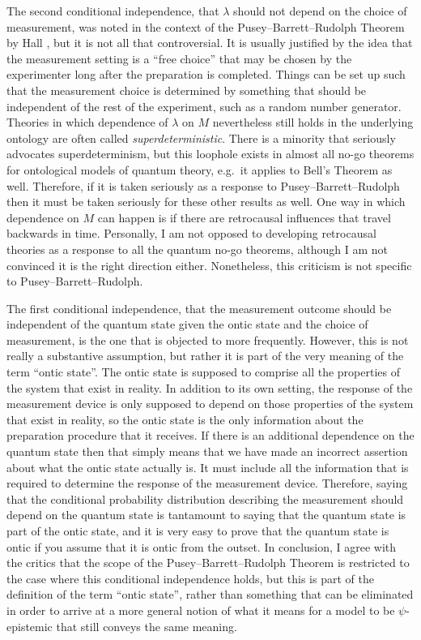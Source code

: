 \documentclass[DIV=calc,fontsize=12pt]{scrartcl} %
\theoremstyle{definition}
\theoremstyle{plain}
\begin{document}
The second conditional independence, that $\lambda$ should not depend
on the choice of measurement, was noted in the context of the
Pusey--Barrett--Rudolph Theorem by Hall \cite{Hall2011}, but it is not
all that controversial.  It is usually justified by the idea that the
measurement setting is a ``free choice'' that may be chosen by the
experimenter long after the preparation is completed.  Things can be
set up such that the measurement choice is determined by something
that should be independent of the rest of the experiment, such as a
random number generator.  Theories in which dependence of $\lambda$ on
$M$ nevertheless still holds in the underlying ontology are often
called \emph{superdeterministic}.  There is a minority that seriously
advocates superdeterminism, but this loophole exists in almost all
no-go theorems for ontological models of quantum theory, e.g.\ it
applies to Bell's Theorem as well.  Therefore, if it is taken
seriously as a response to Pusey--Barrett--Rudolph then it must be
taken seriously for these other results as well.  One way in which
dependence on $M$ can happen is if there are retrocausal influences
that travel backwards in time.  Personally, I am not opposed to
developing retrocausal theories as a response to all the quantum no-go
theorems, although I am not convinced it is the right direction
either.  Nonetheless, this criticism is not specific to
Pusey--Barrett--Rudolph.

The first conditional independence, that the measurement outcome
should be independent of the quantum state given the ontic state and
the choice of measurement, is the one that is objected to more
frequently.  However, this is not really a substantive assumption, but
rather it is part of the very meaning of the term ``ontic state''.
The ontic state is supposed to comprise all the properties of the
system that exist in reality.  In addition to its own setting, the
response of the measurement device is only supposed to depend on those
properties of the system that exist in reality, so the ontic state is
the only information about the preparation procedure that it receives.
If there is an additional dependence on the quantum state then that
simply means that we have made an incorrect assertion about what the
ontic state actually is.  It must include all the information that is
required to determine the response of the measurement device.
Therefore, saying that the conditional probability distribution
describing the measurement should depend on the quantum state is
tantamount to saying that the quantum state is part of the ontic
state, and it is very easy to prove that the quantum state is ontic if
you assume that it is ontic from the outset.  In conclusion, I agree
with the critics that the scope of the Pusey--Barrett--Rudolph Theorem is restricted to
the case where this conditional independence holds, but this is part
of the definition of the term ``ontic state'', rather than something
that can be eliminated in order to arrive at a more general notion of
what it means for a model to be $\psi$-epistemic that still conveys
the same meaning.
\end{document}
